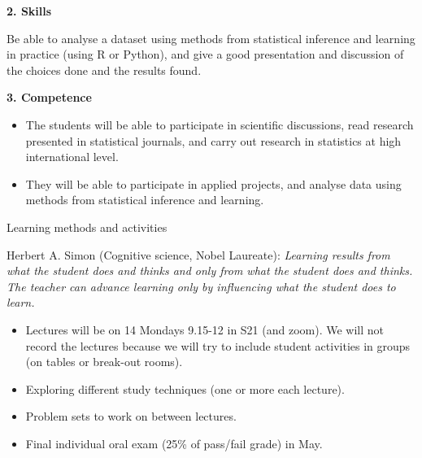 \documentclass[
  ignorenonframetext,
]{beamer}
\providecommand{\tightlist}{%
  \setlength{\itemsep}{0pt}\setlength{\parskip}{0pt}}
\begin{document}
\begin{frame}

\textbf{2. Skills}

Be able to analyse a dataset using methods from statistical inference
and learning in practice (using R or Python), and give a good
presentation and discussion of the choices done and the results found.

\textbf{3. Competence}

\begin{itemize}
\tightlist
\item
  The students will be able to participate in scientific discussions,
  read research presented in statistical journals, and carry out
  research in statistics at high international level.
\item
  They will be able to participate in applied projects, and analyse data
  using methods from statistical inference and learning.
\end{itemize}

\end{frame}

\begin{frame}

\begin{block}{Learning methods and activities}

Herbert A. Simon (Cognitive science, Nobel Laureate): \emph{Learning
results from what the student does and thinks and only from what the
student does and thinks. The teacher can advance learning only by
influencing what the student does to learn.}

\begin{itemize}
\item
  Lectures will be on 14 Mondays 9.15-12 in S21 (and zoom). We will not
  record the lectures because we will try to include student activities
  in groups (on tables or break-out rooms).
\item
  Exploring different study techniques (one or more each lecture).
\item
  Problem sets to work on between lectures.
\item
  Final individual oral exam (25\% of pass/fail grade) in May.
\end{itemize}

\end{block}

\end{frame}
\end{document}
